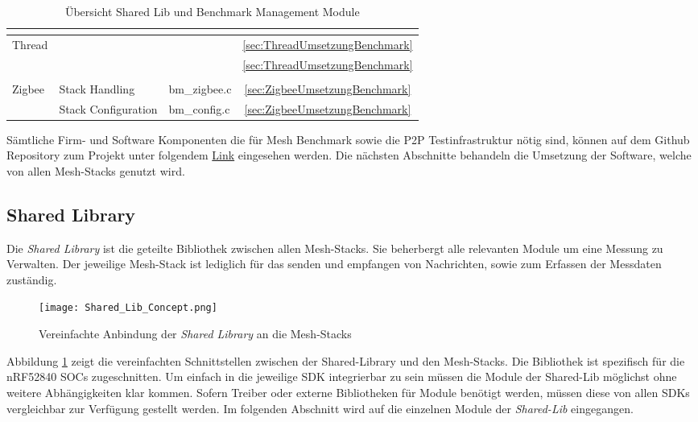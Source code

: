 \begin{table}
\begin{tabular}{|l|l|l|c|}
\hline
\multicolumn{1}{l}{} & \multicolumn{1}{l}{} & \multicolumn{1}{l}{} & \multicolumn{1}{l}{} \\ 
\hline
\multirow{2}{*}{Thread} &  &  & \ref{sec:ThreadUmsetzungBenchmark} \\ 
\cline{2-4}
 &  &  & \ref{sec:ThreadUmsetzungBenchmark} \\ 
\hline
\multicolumn{1}{l}{} & \multicolumn{1}{l}{} & \multicolumn{1}{l}{} & \multicolumn{1}{l}{} \\ 
\hline
\multirow{2}{*}{Zigbee} & Stack Handling & bm\_zigbee.c & \ref{sec:ZigbeeUmsetzungBenchmark} \\ 
\cline{2-4}
 & Stack Configuration & bm\_config.c & \ref{sec:ZigbeeUmsetzungBenchmark} \\
\hline
\end{tabular}
\caption{Übersicht Shared Lib und Benchmark Management Module}
\label{tab:UebersichtSoftware}
\end{table}


Sämtliche Firm- und Software Komponenten die für Mesh Benchmark sowie die P2P Testinfrastruktur nötig sind, können auf dem Github Repository zum Projekt unter folgendem \href{https://github.com/Rouben94/P6_Software}{Link\footnotemark[\value{footnote}]}  eingesehen werden. Die nächsten Abschnitte behandeln die Umsetzung der Software, welche von allen Mesh-Stacks genutzt wird.





\subsection{Shared Library}\label{subsec:SharedLibrary}

Die \textit{Shared Library} ist die geteilte Bibliothek zwischen allen Mesh-Stacks. Sie beherbergt alle relevanten Module um eine Messung zu Verwalten. Der jeweilige Mesh-Stack ist lediglich für das senden und empfangen von Nachrichten, sowie zum Erfassen der Messdaten zuständig. 


\begin{figure}[H]
	\centering
	\texttt{[image: Shared\_Lib\_Concept.png]}
	\caption{Vereinfachte Anbindung der \textit{Shared Library} an die Mesh-Stacks}\label{fig:ShardeLibConcept}
\end{figure}

Abbildung \ref{fig:ShardeLibConcept} zeigt die vereinfachten Schnittstellen zwischen der Shared-Library und den Mesh-Stacks. Die Bibliothek ist spezifisch für die nRF52840 SOCs zugeschnitten. Um einfach in die jeweilige SDK integrierbar zu sein müssen die Module der Shared-Lib möglichst ohne weitere Abhängigkeiten klar kommen. Sofern Treiber oder externe Bibliotheken für Module benötigt werden, müssen diese von allen SDKs vergleichbar zur Verfügung gestellt werden. Im folgenden Abschnitt wird auf die einzelnen Module der \textit{Shared-Lib} eingegangen. 


